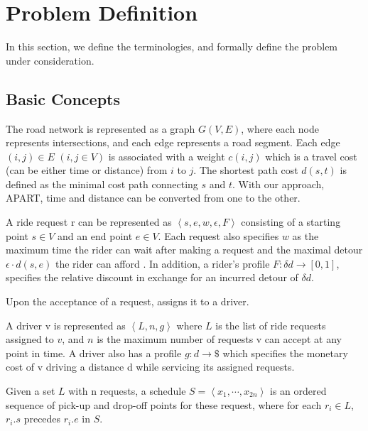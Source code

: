\section{Problem Definition}
\label{sec:problem_def}

In this section, we define the terminologies, and formally define the problem under consideration.

\subsection{Basic Concepts}
The road network is represented as a graph $G(V, E)$, where each node represents intersections, and each edge represents a road segment. 
Each edge $(i,j) \in E$ $(i, j \in V)$ is associated with a weight $c(i,j)$ which is a travel cost (can be either time or distance) from $i$ to $j$.
The shortest path cost $d(s,t)$ is defined as the minimal cost path connecting $s$ and $t$. With our approach, APART, time and distance can be converted from one to the other.

\begin{definition} 
\label{def:req}
A ride request r can be represented as $\left\langle s, e, w, \epsilon, F \right\rangle$ consisting of a starting point $s \in V$ and an end point $e \in V$. Each request also specifies $w$ as the maximum time the rider can wait after making a request and the maximal detour $\epsilon\cdot d(s, e)$ the rider can afford . In addition, a rider's profile $F: \delta d \rightarrow \left[ 0, 1 \right] $, specifies the relative discount in exchange for an incurred detour of $\delta d$.
\end{definition}

Upon the acceptance of a request, \fname assigns it to a driver.

\begin{definition} [Driver]
A driver v is represented as $\left\langle L, n, g \right\rangle$ where $L$ is the list of ride requests assigned to $v$, and $n$ is the maximum number of requests v can accept at any point in time. A driver also has a profile $g: d \rightarrow \$ $ which specifies the monetary cost of v driving a distance d while servicing its assigned requests.
\end{definition} 

\begin{definition} [Schedule]
Given a set $L$ with n requests, a schedule $S= \left\langle x_1, \cdots, x_{2n} \right\rangle$ is an ordered sequence of pick-up and drop-off points for these request, where for each $r_i \in L$, $r_i.s$ precedes $r_i.e$ in $S$. 
\end{definition}

